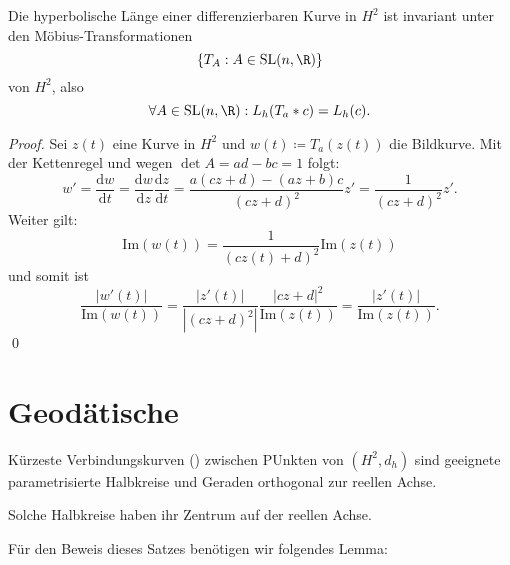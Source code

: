 \begin{lemma}
  Die hyperbolische Länge einer differenzierbaren Kurve in \( H^2 \) ist invariant unter den Möbius-Transformationen
  \begin{equation*}
    \left \{ T_A : A \in \text{SL}(n,\R) \right \}
  \end{equation*}
  von \( H^2 \), also
  \begin{equation*}
    \forall A \in \text{SL}(n,\R) : L_h(T_a * c) = L_h(c)\text{.}
  \end{equation*}
  \begin{proof}
    Sei \( z(t) \) eine Kurve in \( H^2 \) und \( w(t) \coloneqq T_a(z(t)) \) die Bildkurve. Mit der Kettenregel und wegen \( \det A = ad - bc = 1 \) folgt:
    \begin{equation*}
      w' = \frac{\text{d}w}{\text{d}t} = \frac{\text{d}w}{\text{d}z} \frac{\text{d}z}{\text{d}t} = \frac{a(cz + d) - (az + b)c}{(cz + d)^2}z' = \frac{1}{(cz + d)^2}z' \text{.}
    \end{equation*}
    Weiter gilt:
    \begin{equation*}
      \text{Im}(w(t)) = \frac{1}{(cz(t) + d)^2}\text{Im}(z(t))
    \end{equation*}
    und somit ist
    \begin{equation*}
      \frac{\left\vert w'(t) \right\vert}{\text{Im}(w(t))} = \frac{\left\vert z'(t) \right\vert}{\left\vert (cz + d)^2 \right\vert} \frac{\left\vert cz + d \right\vert^2}{\text{Im}(z(t))} = \frac{\left\vert z'(t) \right\vert}{\text{Im}(z(t))}\text{.}
    \end{equation*} \qed
  \end{proof}
\end{lemma}

\section{Geodätische}

\begin{theorem}[Geodätische]
  Kürzeste Verbindungskurven () zwischen PUnkten von \( (H^2, d_h) \) sind geeignete parametrisierte Halbkreise und Geraden orthogonal zur reellen Achse.

  Solche Halbkreise haben ihr Zentrum auf der reellen Achse.
\end{theorem}

Für den Beweis dieses Satzes benötigen wir folgendes Lemma:

